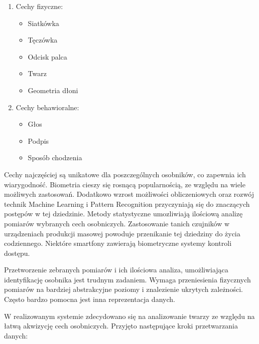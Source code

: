 \documentclass[oneside, eng]{mgr}
\begin{document}
\begin{enumerate}

\item Cechy fizyczne:
	\begin{itemize}
		\item Siatkówka
		\item Tęczówka
		\item Odcisk palca
		\item Twarz
		\item Geometria dłoni
	\end{itemize}

\item Cechy behawioralne:
	\begin{itemize}
		\item Głos
		\item Podpis
		\item Sposób chodzenia
	\end{itemize}

\end{enumerate} 

Cechy najczęściej są unikatowe dla poszczególnych osobników, co zapewnia ich wiarygodność. Biometria cieszy się rosnącą popularnością, ze względu na wiele możliwych zastosowań. Dodatkowo wzrost możliwości obliczeniowych oraz rozwój technik Machine Learning i Pattern Recognition przyczyniają się do znaczących postępów w tej dziedzinie. Metody statystyczne umozliwiają ilościową analizę pomiarów wybranych cech osobniczych. Zastosowanie tanich czujników w urządzeniach produkcji masowej powoduje przenikanie tej dziedziny do życia codziennego. Niektóre smartfony zawierają biometryczne systemy kontroli dostępu. 

Przetworzenie zebranych pomiarów i ich ilościowa analiza, umożliwiająca identyfikację osobnika jest trudnym zadaniem. Wymaga przeniesienia fizycznych pomiarów na bardziej abstrakcyjne poziomy i znalezienie ukrytych zależności. Często bardzo pomocna jest inna reprezentacja danych. 

W realizowanym systemie zdecydowano się na analizowanie twarzy ze względu na łatwą akwizycję cech osobniczych. Przyjęto następujące kroki przetwarzania danych:
\end{document}
